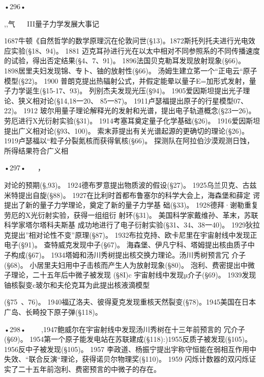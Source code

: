 •296•
 

,,气
  
III量子力学发展大事记

1687牛顿《自然哲学的数学原理沉在伦敦问世(§13)。1872斯托列托夫进行光电效应实验(§18、94)。
	1881	迈克耳孙进行光在以太中相对不同参照系的不同传播速度的试验，得出否定结果(§4、7、91)。
1896法国贝克勒耳发现放射现象(§66)。
1898居里夫妇发现锦、专卜、铀的放射性(§66)。
汤姆生建立笫一个“正电云“原子模型(§22)。
	1900	普朗克提出热辐射公式，并假定能晕以量子E=加形式发射，量子力学诞生(§15-17、93)。
列别杰夫发现光压(§94)。
1905爱因斯坦提出光子理论、狭义相对论(§14,18一20、
85一87)。
1911卢瑟福提出原子的行星模型07、22)。
	1912	玻尔用量子理论解释光的发射和光谱，提出电子轨道概念(§23一26)。
劳厄进行X光衍射实验(§31)。
1914考塞耳奠定量子化学基础(§26)。
1916爱因斯坦提出广义相对论(§93、100)。
索末菲提出有关光谱起源的更确切的理论(§26)。
1919卢瑟福以“粒子分裂氮核而获得氧核(§66)。
探测队在阿拉伯沙漠观测日蚀，所得结果符合广义相

•297•
  
，
 

对论的预期(§,93)。
1924德布罗意提出物质波的假设(§27)。
1925乌兰贝克、古兹米特提出自旋(§88)。
1927在比利时首都布鲁塞尔的科学大会上，海森堡和薛定
谔提出了新的量子力学理论，奠定了新的量子力学基
础(§33)。
1928德拜·谢勒重复劳厄的X光衍射实验，获得一组组衍
射环(§31)。
美国科学家戴维孙、革末，苏联科学家塔尔塔科夫斯基
成功地进行了电子衍射实验(§31、34、38一40)。
1929狄拉克提出”相对论性不变”原理(§87)。
1932布拉克持、欧卡尼里在宇宙射线中发现正电子(§91)。
查特威克发现中子(§67)。
海森堡、伊凡宁科、塔姆提出核由质子中子构成(§67)。
1934塔姆和汤川秀树提出核交换力理论。汤川秀树预言冗
介子(§68)。
小居里夫妇用中子击核而产生人为放射现象(§80)。
泡利、费密提出中微子理论，二十五年后中微子被发现
(§8I)c
宇宙射线中发现µ介子(§69)。
1939发现铀核裂变c玻尔和夫伦克耳为此提出核液滴模型

(§75~、76)。
1940福辽洛夫、彼得夏克发现重核天然裂变(§78)。1945美国在日本广岛、长畸投下原子弹(§118)。

•298•
  
~,1947鲍威尔在宇宙射线中发现汤川秀树在十三年前预言的
冗介子(§69)。
1954第一个原子能发电站在苏联建成(§118):)1955反质子被发现(§105)。
1956反中子被发现(§105)。
	1957	李政道、杨振宁提出宇称守恒能在弱相互作用中失效、“联合反演“理论，获得诺贝尔物理奖(§110)。
	1959	闪烁计数器的双闪烁证实了二十五年前泡利、费密预言的中微子的存在。

